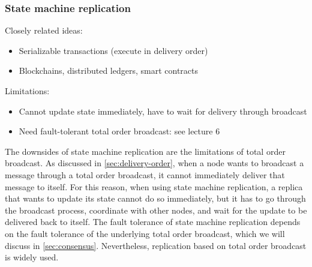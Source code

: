 \begin{frame}
    \label{s:smr2}
    \frametitle{State machine replication}
    \pause\vspace*{0.5em}
    Closely related ideas:
    \begin{itemize}
        \item Serializable transactions (execute in delivery order)\pause
        \item Blockchains, distributed ledgers, smart contracts\pause
    \end{itemize}
    Limitations:
    \begin{itemize}
        \item Cannot update state immediately, have to wait for delivery through broadcast\pause
        \item Need fault-tolerant total order broadcast: see lecture 6
    \end{itemize}
\end{frame}
\label{l:smr2}

The downsides of state machine replication are the limitations of total order broadcast.
As discussed in \autoref{sec:delivery-order}, when a node wants to broadcast a message through a total order broadcast, it cannot immediately deliver that message to itself.
For this reason, when using state machine replication, a replica that wants to update its state cannot do so immediately, but it has to go through the broadcast process, coordinate with other nodes, and wait for the update to be delivered back to itself.
The fault tolerance of state machine replication depends on the fault tolerance of the underlying total order broadcast, which we will discuss in \autoref{sec:consensus}.
Nevertheless, replication based on total order broadcast is widely used.

